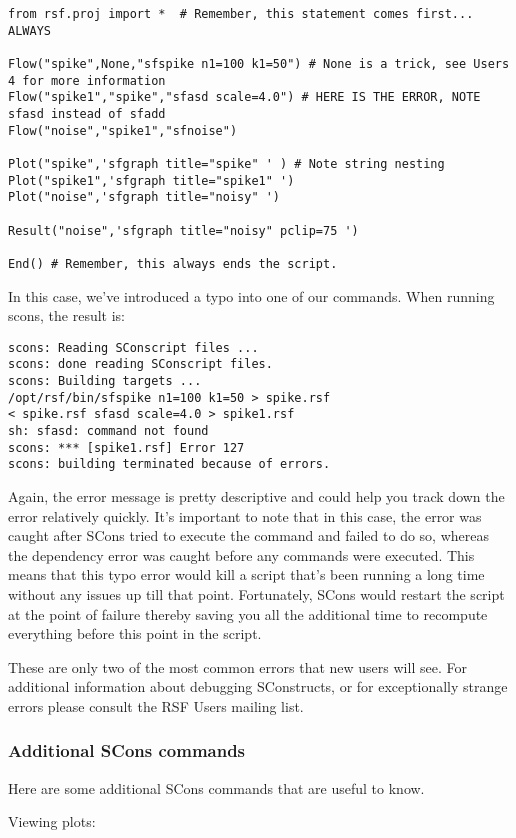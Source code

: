 \begin{verbatim}
from rsf.proj import *  # Remember, this statement comes first... ALWAYS

Flow("spike",None,"sfspike n1=100 k1=50") # None is a trick, see Users 4 for more information
Flow("spike1","spike","sfasd scale=4.0") # HERE IS THE ERROR, NOTE sfasd instead of sfadd
Flow("noise","spike1","sfnoise")

Plot("spike",'sfgraph title="spike" ' ) # Note string nesting
Plot("spike1",'sfgraph title="spike1" ') 
Plot("noise",'sfgraph title="noisy" ')

Result("noise",'sfgraph title="noisy" pclip=75 ')

End() # Remember, this always ends the script.
\end{verbatim}
In this case, we've introduced a typo into one of our commands.  When running scons, the result is:
\begin{verbatim}
scons: Reading SConscript files ...
scons: done reading SConscript files.
scons: Building targets ...
/opt/rsf/bin/sfspike n1=100 k1=50 > spike.rsf
< spike.rsf sfasd scale=4.0 > spike1.rsf
sh: sfasd: command not found
scons: *** [spike1.rsf] Error 127
scons: building terminated because of errors.
\end{verbatim}
Again, the error message is pretty descriptive and could help you track down the error relatively quickly.  It's important to note that in this case, the error was caught after SCons tried to execute the command and failed to do so, whereas the dependency error was caught before any commands were executed.  This means that this typo error would kill a script that's been running a long time without any issues up till that point.  Fortunately, SCons would restart the script at the point of failure thereby saving you all the additional time to recompute everything before this point in the script.

These are only two of the most common errors that new users will see.  For additional information about debugging SConstructs, or for exceptionally strange errors please consult the RSF Users mailing list.

\subsubsection{Additional SCons commands}

Here are some additional SCons commands that are useful to know.

Viewing plots:

